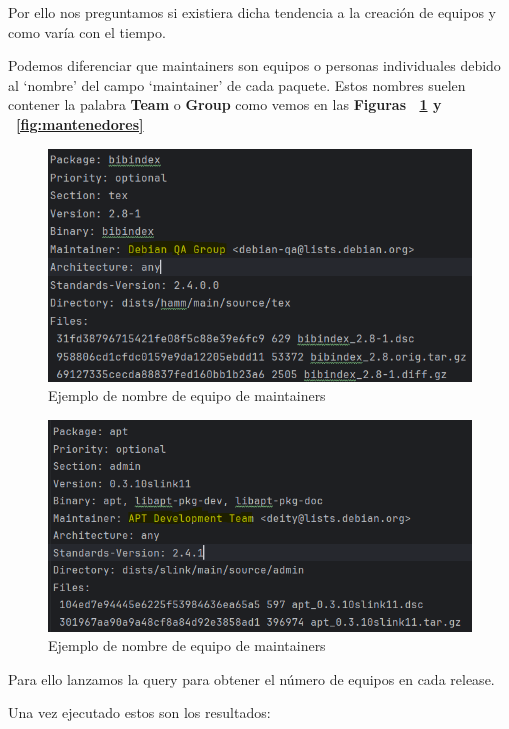 \documentclass[a4paper, 12pt]{book}
\begin{document}
Por ello nos preguntamos si existiera dicha tendencia a la creación de equipos y como varía con el tiempo.

Podemos diferenciar que maintainers son equipos o personas individuales debido al `nombre' del campo `maintainer' de cada paquete. Estos nombres suelen contener la palabra \textbf{Team} o \textbf{Group} como vemos en las \textbf{Figuras ~\ref{fig:ejemplo_equipo_1} y ~\ref{fig:mantenedores}}

\begin{figure}
	\centering
	\includegraphics[width=15cm, keepaspectratio]{img/Ejemplo equipo 1.png}
	\caption{Ejemplo de nombre de equipo de maintainers}
	\label{fig:ejemplo_equipo_1}
\end{figure}

\begin{figure}
	\centering
	\includegraphics[width=15cm, keepaspectratio]{img/Ejemplo equipo 2.png}
	\caption{Ejemplo de nombre de equipo de maintainers}
	\label{fig:ejemplo_equipo_2}
\end{figure}

Para ello lanzamos la query para obtener el número de equipos en cada release.

Una vez ejecutado estos son los resultados:
\end{document}
